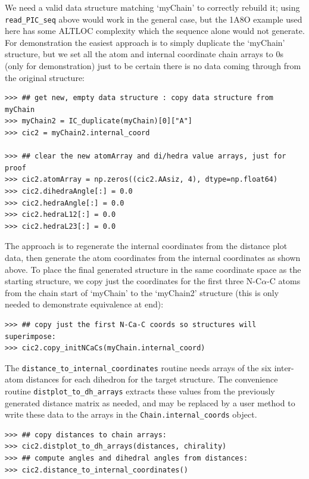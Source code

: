 We need a valid data structure matching `myChain' to correctly rebuild it; using
\texttt{read\_PIC\_seq\(\)} above would work in the general case, but the 1A8O example
used here has some ALTLOC complexity which the sequence alone would not generate.
For demonstration the easiest approach is to simply duplicate the `myChain'
structure, but we set all the atom and internal coordinate chain arrays to 0s
(only for demonstration) just to be certain there is no data coming through from the
original structure:

\begin{verbatim}
>>> ## get new, empty data structure : copy data structure from myChain
>>> myChain2 = IC_duplicate(myChain)[0]["A"]
>>> cic2 = myChain2.internal_coord

>>> ## clear the new atomArray and di/hedra value arrays, just for proof
>>> cic2.atomArray = np.zeros((cic2.AAsiz, 4), dtype=np.float64)
>>> cic2.dihedraAngle[:] = 0.0
>>> cic2.hedraAngle[:] = 0.0
>>> cic2.hedraL12[:] = 0.0
>>> cic2.hedraL23[:] = 0.0
\end{verbatim}

The approach is to regenerate the internal coordinates from the distance plot
data, then generate the atom coordinates from the internal coordinates as shown
above.  To place the final generated structure in the same coordinate space as the
starting structure, we copy just the coordinates for the first three N-C$\alpha$-C
atoms from the chain start of `myChain' to the `myChain2' structure (this is only needed
to demonstrate equivalence at end):

\begin{verbatim}
>>> ## copy just the first N-Ca-C coords so structures will superimpose:
>>> cic2.copy_initNCaCs(myChain.internal_coord)
\end{verbatim}

The \texttt{distance\_to\_internal\_coordinates\(\)} routine needs arrays of the six
inter-atom distances for each dihedron for the target structure.  The convenience
routine \texttt{distplot\_to\_dh\_arrays\(\)} extracts these values from the previously
generated distance matrix as needed, and may be replaced by a user method to
write these data to the arrays in the \texttt{Chain.internal\_coords} object.

\begin{verbatim}
>>> ## copy distances to chain arrays:
>>> cic2.distplot_to_dh_arrays(distances, chirality)
>>> ## compute angles and dihedral angles from distances:
>>> cic2.distance_to_internal_coordinates()
\end{verbatim}

